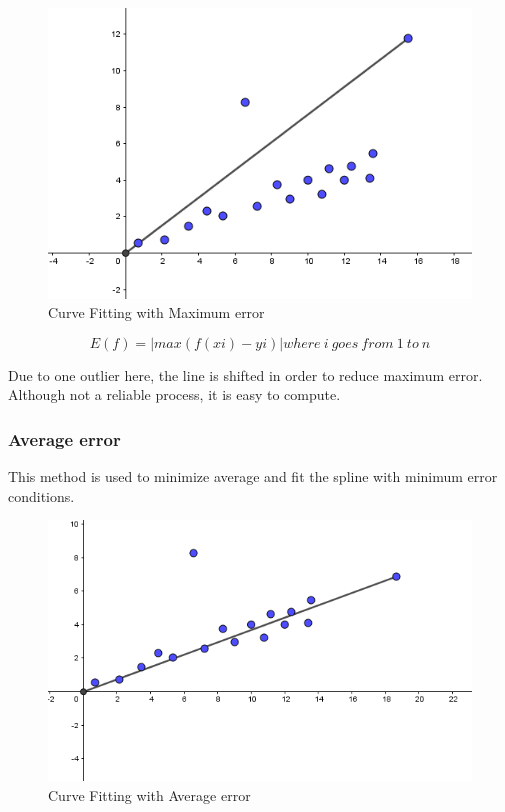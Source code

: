 \begin{figure}[!htb]
\includegraphics[width=\textwidth]{./figures/Maxerror.PNG}
\caption{Curve Fitting with Maximum error }
\end{figure}

\begin{equation}
E(f)=|max (f(xi)-yi)|  where\ i\ goes\ from\ 1\ to\ n
\end{equation}

Due to one outlier here, the line is shifted in order to reduce maximum error. Although not a reliable process, it is easy to compute.

\subsubsection{Average error}
This method is used to minimize average and fit the spline with minimum error conditions.

\begin{figure}[!htb]
\includegraphics[width=\textwidth]{./figures/average.PNG}
\caption{Curve Fitting with Average error }
\end{figure}

